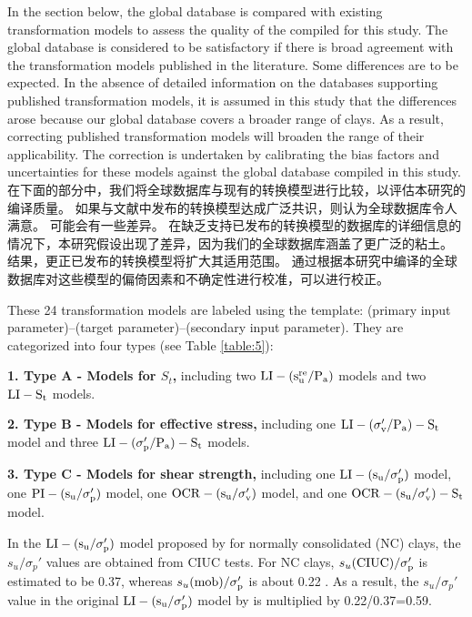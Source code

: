 \begin{Parallel}{0.60\textwidth}{}
    {
        In the section below, the global database is compared with existing transformation models to assess the quality of the  compiled for this study. The global database is considered to be satisfactory if there is broad agreement with the transformation models published in the literature. Some differences are to be expected. In the absence of detailed information on the databases supporting published transformation models, it is assumed in this study that the differences arose because our global database covers a broader range of clays. As a result, correcting published transformation models will broaden the range of their applicability. The correction is undertaken by calibrating the bias factors and uncertainties for these models against the global database compiled in this study.
    }
    \ParallelRText
    {
        在下面的部分中，我们将全球数据库与现有的转换模型进行比较，以评估本研究的编译质量。 如果与文献中发布的转换模型达成广泛共识，则认为全球数据库令人满意。 可能会有一些差异。 在缺乏支持已发布的转换模型的数据库的详细信息的情况下，本研究假设出现了差异，因为我们的全球数据库涵盖了更广泛的粘土。 结果，更正已发布的转换模型将扩大其适用范围。 通过根据本研究中编译的全球数据库对这些模型的偏倚因素和不确定性进行校准，可以进行校正。
    }
    \ParallelPar
    \ParallelLText
    {
        These 24 transformation models are labeled using the template: (primary input parameter)–(target parameter)–(secondary input parameter). They are categorized into four types (see Table \ref{table:5}):

        \textbf{1. Type A - Models for $S_t$,} including two $\rm{LI}-(s_u^{re}/P_a)$ models and two $\rm{LI}-S_t$ models.

        \textbf{2. Type B - Models for effective stress,} including one $\rm{LI}-(\sigma_v'/P_a)-S_t$ model and three $\rm{LI}-(\sigma_p'/P_a)-S_t$ models.

        \textbf{3. Type C - Models for shear strength,} including one $\rm{LI}-(s_u/\sigma_p')$ model, one $\rm{PI}-(s_u/\sigma_p')$ model, one $\rm{OCR}-(s_u/\sigma_v')$ model, and one $\rm{OCR}-(s_u/\sigma_v')-S_t$ model. 

        In the $\rm{LI}-(s_u/\sigma_p')$ model proposed by \citet{Bjerrum1960711} for normally consolidated (NC) clays, the $s_u/\sigma_p'$ values are obtained from CIUC tests. For NC clays, $s_u(\rm{CIUC})/\sigma_p'$ is estimated to be 0.37, whereas $s_u(\rm{mob})/\sigma_p'$ is about 0.22 \citep{Mesri1975409}. As a result, the $s_u/\sigma_p'$ value in the original $\rm{LI}-(s_u/\sigma_p')$ model by \citet{Bjerrum1960711} is multiplied by 0.22/0.37=0.59.

}
\end{Parallel}
